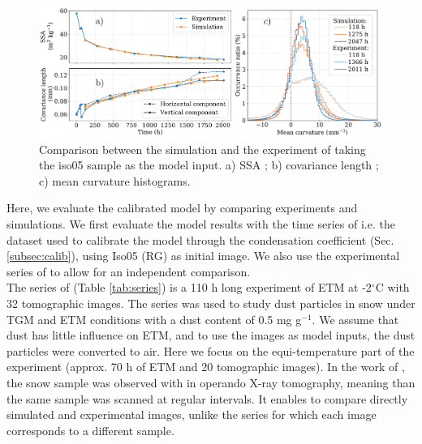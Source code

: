 \documentclass[draft,ms]{agujournal2019}
\begin{document}
\begin{figure}
    \centering
    \includegraphics[width=\linewidth]{Figures/microstruct_isoFlin_exp_simu.pdf}
    \caption{Comparison between the simulation and the experiment of \protect{} taking the iso05 sample as the model input. a) SSA ; b) covariance length ; c) mean curvature histograms.}
    \label{fig:flin_evaluation}
\end{figure}

Here, we evaluate the calibrated model by comparing experiments and simulations. We first evaluate the model results with the time series of  i.e. the dataset used to calibrate the model through the condensation coefficient (Sec. \ref{subsec:calib}), using  Iso05 (RG) as initial image. We also use the experimental series of  to allow for an independent comparison.\\

The series of  (Table \ref{tab:series}) is a 110 h long experiment of ETM at -2$^\circ$C with 32 tomographic images. The series was used to study dust particles in snow under TGM and ETM conditions with a dust content of 0.5 mg g$^{-1}$. We assume that dust has little influence on ETM, and to use the images as model inputs, the dust particles were converted to air. Here we focus on the equi-temperature part of the experiment (approx. 70 h of ETM and 20 tomographic images). In the work of , the snow sample was observed with in operando X-ray tomography, meaning than the same sample was scanned at regular intervals. It enables to compare directly simulated and experimental images, unlike the  series for which each image corresponds to a different sample.\\
\end{document}
